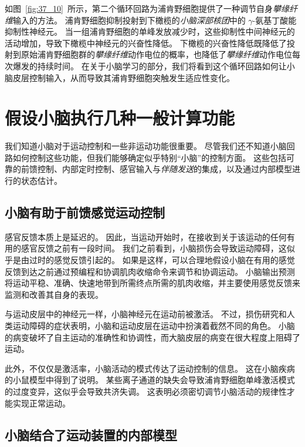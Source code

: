 如图~\ref{fig:37_10}~所示，第二个循环回路为浦肯野细胞提供了一种调节自身\textit{攀缘纤维}输入的方法。
浦肯野细胞抑制投射到下橄榄的\textit{小脑深部核团}中的 $\gamma$-氨基丁酸能抑制性神经元。
当一组浦肯野细胞的单峰发放减少时，这些抑制性中间神经元的活动增加，导致下橄榄中神经元的兴奋性降低。
下橄榄的兴奋性降低既降低了投射到原始浦肯野细胞群的\textit{攀缘纤维}动作电位的概率，也降低了\textit{攀缘纤维}动作电位每次爆发的持续时间。
在关于小脑学习的部分，我们将看到这个循环回路如何让小脑皮层控制输入，从而导致其浦肯野细胞突触发生适应性变化。



\section{假设小脑执行几种一般计算功能}

我们知道小脑对于运动控制和一些非运动功能很重要。
尽管我们还不知道小脑回路如何控制这些功能，但我们能够确定似乎特别“小脑”的控制方面。
这些包括可靠的前馈控制、内部定时控制、感官输入与\textit{伴随发送}的集成，以及通过内部模型进行的状态估计。



\subsection{小脑有助于前馈感觉运动控制}

感官反馈本质上是延迟的。
因此，当运动开始时，在接收到关于该运动的任何有用的感官反馈之前有一段时间。
我们之前看到，小脑损伤会导致运动障碍，这似乎是由过时的感觉反馈引起的。
如果是这样，可以合理地假设小脑在有用的感觉反馈到达之前通过预编程和协调肌肉收缩命令来调节和协调运动。
小脑输出预测将运动平稳、准确、快速地带到所需终点所需的肌肉收缩，并主要使用感觉反馈来监测和改善其自身的表现。


与运动皮层中的神经元一样，小脑神经元在运动前被激活。
不过，损伤研究和人类运动障碍的症状表明，小脑和运动皮层在运动中扮演着截然不同的角色。
小脑的病变破坏了自主运动的准确性和协调性，而大脑皮层的病变在很大程度上阻碍了运动。


此外，不仅仅是激活率，小脑活动的模式传达了运动控制的信息。
这在小脑疾病的小鼠模型中得到了说明。
某些离子通道的缺失会导致浦肯野细胞单峰激活模式的过度变异，这似乎会导致共济失调。
这表明必须密切调节小脑活动的规律性才能实现正常运动。



\subsection{小脑结合了运动装置的内部模型}

